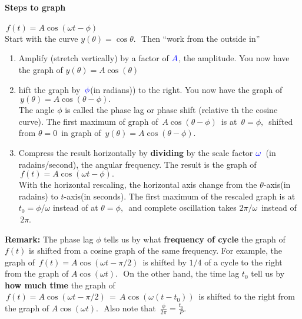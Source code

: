 \paragraph{Steps to graph} $\, f(t)=A \cos (\omega t - \phi )$\\
Start with the curve $y(\theta )=\cos \theta .\, \,$ Then ``work from the outside in''
\begin{enumerate}
\item Amplify (stretch vertically) by a factor of ${\color{blue}A}$,
  the {\color{blue}amplitude}. You now have the graph of $y(\theta )=A\cos (\theta )$
\item hift the graph by $\, {\color{blue}{\phi }}$(in {\color{orange}radians})) to the
  right. You now have the graph of $\, y(\theta )=A\cos (\theta -\phi ).\, \,$\\
  
  The angle $\phi$ is called the {\color{blue}phase lag} or {\color{blue}phase shift} (relative th the cosine curve).
  The first maximum of graph of $\, A\cos (\theta -\phi )\,$ is at $\, \theta =\phi ,\,$ shifted from $\theta =0\,$
  in graph of $\, y(\theta )=A\cos (\theta -\phi ).\, \,$
\item Compress the result horizontally by \textbf{dividing} by the scale factor ${\color{blue}{\omega }} \,$
  (in {\color{orange}radains/second}), the {\color{blue} angular frequency}.
  The result is the graph of  $\, f(t)=A\cos (\omega t-\phi ).\, \,$\\
  
  With the horizontal rescaling, the horizontal axis change from the $\theta$-axis(in radains) to
  $t$-axis(in seconds). The first maximum of the rescaled graph is at $t_0=\phi /\omega$ instead of
  at $\theta =\phi ,\,$ and complete oscillation takes $2\pi /\omega \,$ instead of $\, 2\pi$.  
\end{enumerate}

\textbf{Remark:} The phase lag $\phi$ tells us by what \textbf{frequency of cycle} the graph
of $f(t)$ is shifted from a cosine graph of the same frequency.
For example, the graph of $\, f(t)=A\cos (\omega t-\pi /2)\,$ is shifted by $1/4$ of a cycle
to the right from the graph of $A\cos (\omega t).\, \,$
On the other hand, the time lag $t_0$ tell us by \textbf{how much time} the graph of 
$\, f(t)=A\cos (\omega t-\pi /2)\, =\, A\cos \left(\omega (t-t_0)\right)\,$ is shifted to
the right from the graph of $A\cos (\omega t).\, \,$ Also note that
$\displaystyle \, \frac{\phi }{2\pi }= \frac{t_0}{P}.$

